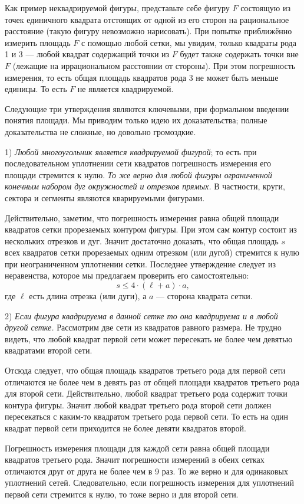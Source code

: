 {Как пример неквадрируемой фигуры, представьте себе фигуру $F$ состоящую из точек единичного квадрата отстоящих от одной из его сторон на рациональное расстояние (такую фигуру невозможно нарисовать). 
При попытке приближённо измерить площадь $F$ с помощью любой сетки, мы увидим, только квадраты рода 1 и 3 — любой квадрат содержащий точки из $F$ будет также содержать точки вне $F$ (лежащие на иррациональном расстоянии от стороны).
При этом погрешность измерения, то есть общая площадь квадратов рода 3 не может быть меньше единицы. 
То есть $F$ не является квадрируемой.

Следующие три утверждения являются ключевыми, при формальном введении понятия площади.
Мы приводим только идею их доказательства; полные доказательства не сложные, но довольно громоздкие.

1) \emph{Любой многоугольник является квадрируемой фигурой};
то есть при последовательном уплотнении сети квадратов погрешность измерения его площади стремится к нулю. \emph{То же верно для любой фигуры ограниченной конечным набором дуг окружностей и отрезков прямых.}
В частности, круги, сектора и сегменты являются кварируемыми фигурами.

Действительно, заметим, что погрешность измерения равна общей площади квадратов сетки прорезаемых контуром фигуры.
При этом сам контур состоит из нескольких отрезков и дуг.
Значит достаточно доказать, что общая площадь $s$ всех квадратов сетки прорезаемых одним отрезком (или дугой) стремится к нулю при неограниченном уплотнении сетки.
Последнее утверждение следует из неравенства, которое мы предлагаем проверить его самостоятельно:
\[s\le 4\cdot (\ell+a)\cdot a,\]
где $\ell$ есть длина отрезка (или дуги), а $a$ — сторона квадрата сетки.

2) \emph{Если фигура квадрируема в данной сетке то она квадрируема и в любой другой сетке.}
Рассмотрим две сети из квадратов равного размера.
Не трудно видеть, что любой квадрат первой сети 
может пересекать не более чем девятью квадратами второй сети.

Отсюда следует, что общая площадь квадратов третьего рода для первой сети  отличаются не более чем в девять раз от общей площади квадратов третьего рода для второй сети.
Действительно, любой квадрат третьего рода содержит точки контура фигуры.
Значит любой квадрат третьего рода второй сети должен пересекаться с каким-то квадратом третьего рода первой сети.
То есть на один квадрат первой сети приходится не более девяти квадратов второй.


Погрешность измерения площади для каждой сети равна общей площади квадратов третьего рода.
Значит погрешности измерений в обеих сетках отличаются друг от друга не более чем в 9 раз.
То же верно и для одинаковых уплотнений сетей.
Следовательно, если погрешность измерения для уплотнений первой сети стремится к нулю, то тоже верно и для второй сети. 

}
